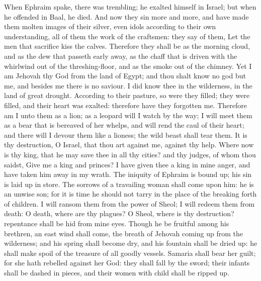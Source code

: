 When Ephraim spake, there was trembling; he exalted himself in Israel; but when he offended in Baal, he died. And now they sin more and more, and have made them molten images of their silver, even idols according to their own understanding, all of them the work of the craftsmen: they say of them, Let the men that sacrifice kiss the calves. Therefore they shall be as the morning cloud, and as the dew that passeth early away, as the chaff that is driven with the whirlwind out of the threshing-floor, and as the smoke out of the chimney.  Yet I am Jehovah thy God from the land of Egypt; and thou shalt know no god but me, and besides me there is no saviour. I did know thee in the wilderness, in the land of great drought. According to their pasture, so were they filled; they were filled, and their heart was exalted: therefore have they forgotten me. Therefore am I unto them as a lion; as a leopard will I watch by the way; I will meet them as a bear that is bereaved of her whelps, and will rend the caul of their heart; and there will I devour them like a lioness; the wild beast shall tear them.  It is thy destruction, O Israel, that thou art against me, against thy help. Where now is thy king, that he may save thee in all thy cities? and thy judges, of whom thou saidst, Give me a king and princes? I have given thee a king in mine anger, and have taken him away in my wrath. The iniquity of Ephraim is bound up; his sin is laid up in store. The sorrows of a travailing woman shall come upon him: he is an unwise son; for it is time he should not tarry in the place of the breaking forth of children. I will ransom them from the power of Sheol; I will redeem them from death: O death, where are thy plagues? O Sheol, where is thy destruction? repentance shall be hid from mine eyes.  Though he be fruitful among his brethren, an east wind shall come, the breath of Jehovah coming up from the wilderness; and his spring shall become dry, and his fountain shall be dried up: he shall make spoil of the treasure of all goodly vessels. Samaria shall bear her guilt; for she hath rebelled against her God: they shall fall by the sword; their infants shall be dashed in pieces, and their women with child shall be ripped up. 

